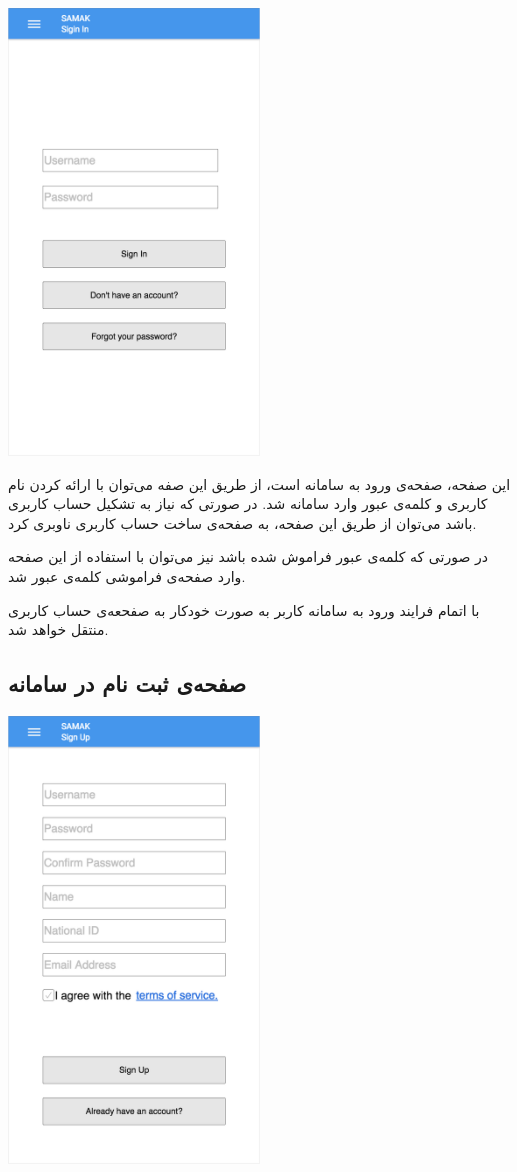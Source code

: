\begin{center}
\includegraphics[width = 0.5\textwidth]{images/2-sign-in.png}
\end{center}


این صفحه، صفحه‌ی ورود به سامانه است، از طریق این صفه می‌توان با ارائه کردن نام کاربری و کلمه‌ی عبور وارد سامانه شد.
در صورتی که نیاز به تشکیل حساب کاربری باشد می‌توان از طریق این صفحه، به صفحه‌ی ساخت حساب کاربری ناوبری کرد.

در صورتی که کلمه‌ی عبور فراموش شده باشد نیز می‌توان با استفاده از این صفحه وارد صفحه‌ی فراموشی کلمه‌ی عبور شد.

با اتمام فرایند ورود به سامانه کاربر به صورت خودکار به صفحعه‌ی حساب کاربری منتقل خواهد شد.

\subsection{صفحه‌ی ثبت نام در سامانه}

\begin{center}
\includegraphics[width = 0.5\textwidth]{images/3-sign-up.png}
\end{center}

